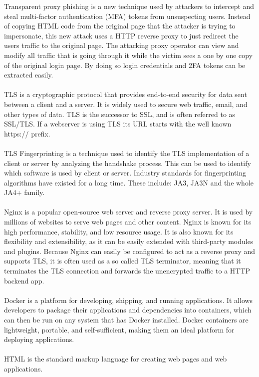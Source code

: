 \documentclass[12pt]{report}
\begin{document}
Transparent proxy phishing is a new technique used by attackers to intercept
and steal multi-factor authentication (MFA) tokens from unsuspecting users. Instead
of copying HTML code from the original page that the attacker is trying to impersonate,
this new attack uses a HTTP reverse proxy to just redirect the users traffic
to the original page. The attacking proxy operator can view and modify all traffic
that is going through it while the victim sees a one by one copy of the original
login page. By doing so login credentials and 2FA tokens can be extracted
easily.\\ \\
TLS is a cryptographic protocol that provides end-to-end security
for data sent between a client and a server. It is widely used to secure web
traffic, email, and other types of data. TLS is the successor to SSL, and is
often referred to as SSL/TLS. If a webserver is using TLS its URL starts with the
well known https:// prefix.\\ \\
TLS Fingerprinting is a technique used to identify
the TLS implementation of a client or server by analyzing the handshake process.
This can be used to identify which software is used by client or server. Industry
standards for fingerprinting algorithms have existed for a long time. These
include: JA3, JA3N and the whole JA4+ family.\\ \\
Nginx is a popular open-source web server and reverse proxy server. It is used by
millions of websites to serve web pages and other content. Nginx is known for its
high performance, stability, and low resource usage. It is also known for its
flexibility and extensibility, as it can be easily extended with third-party modules
and plugins. Because Nginx can easily be configured to act as a reverse proxy and
supports TLS, it is often used as a so called TLS terminator, meaning that it
terminates the TLS connection and forwards the unencrypted traffic to a HTTP backend
app.\\ \\
Docker is a platform for developing, shipping, and running applications. It allows
developers to package their applications and dependencies into containers, which
can then be run on any system that has Docker installed. Docker containers are
lightweight, portable, and self-sufficient, making them an ideal platform for
deploying applications.\\ \\
HTML is the standard markup language for creating web pages and web applications.
\end{document}
